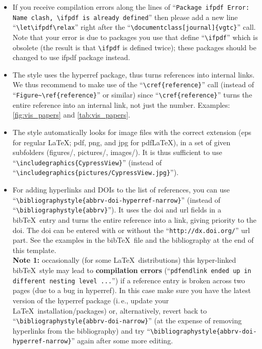 \documentclass{vgtc}                          %
\begin{document}
\begin{itemize}
\item If you receive compilation errors along the lines of ``\texttt{Package ifpdf Error: Name clash, \textbackslash ifpdf is already defined}'' then please add a new line ``\texttt{\textbackslash let\textbackslash ifpdf\textbackslash relax}'' right after the ``\texttt{\textbackslash documentclass[journal]\{vgtc\}}'' call. Note that your error is due to packages you use that define ``\texttt{\textbackslash ifpdf}'' which is obsolete (the result is that \texttt{\textbackslash ifpdf} is defined twice); these packages should be changed to use ifpdf package instead.
\item The style uses the hyperref package, thus turns references into internal links. We thus recommend to make use of the ``\texttt{\textbackslash cref\{reference\}}'' call (instead of ``\texttt{Figure\~{}\textbackslash ref\{reference\}}'' or similar) since ``\texttt{\textbackslash cref\{reference\}}'' turns the entire reference into an internal link, not just the number. Examples: \cref{fig:vis_papers} and \cref{tab:vis_papers}.
\item The style automatically looks for image files with the correct extension (eps for regular \LaTeX; pdf, png, and jpg for pdf\LaTeX), in a set of given subfolders (figures/, pictures/, images/). It is thus sufficient to use ``\texttt{\textbackslash includegraphics\{CypressView\}}'' (instead of ``\texttt{\textbackslash includegraphics\{pictures/CypressView.jpg\}}'').
\item For adding hyperlinks and DOIs to the list of references, you can use ``\texttt{\textbackslash bibliographystyle\{abbrv-doi-hyperref-narrow\}}'' (instead of ``\texttt{\textbackslash bibliographystyle\{abbrv\}}''). It uses the doi and url fields in a bib\TeX\ entry and turns the entire reference into a link, giving priority to the doi. The doi can be entered with or without the ``\texttt{http://dx.doi.org/}'' url part. See the examples in the bib\TeX\ file and the bibliography at the end of this template.\\[1em]
\textbf{Note 1:} occasionally (for some \LaTeX\ distributions) this hyper-linked bib\TeX\ style may lead to \textbf{compilation errors} (``\texttt{pdfendlink ended up in different nesting level ...}'') if a reference entry is broken across two pages (due to a bug in hyperref). In this case make sure you have the latest version of the hyperref package (i.\,e., update your \LaTeX\ installation/packages) or, alternatively, revert back to ``\texttt{\textbackslash bibliographystyle\{abbrv-doi-narrow\}}'' (at the expense of removing hyperlinks from the bibliography) and try ``\texttt{\textbackslash bibliographystyle\{abbrv-doi-hyperref-narrow\}}'' again after some more editing.\\[1em]

\end{itemize}
\end{document}

